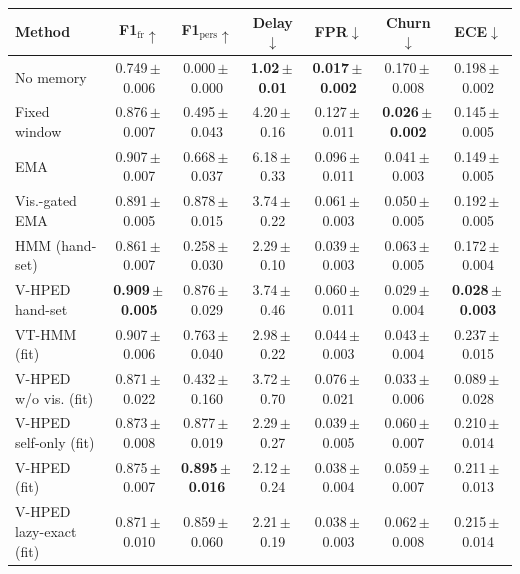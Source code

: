 \begin{tabular}{@{}lcccccc@{}}
\toprule
Method & F1$_{\mathrm{fr}}\uparrow$ & F1$_{\mathrm{pers}}\uparrow$ & Delay$\downarrow$ & FPR$\downarrow$ & Churn$\downarrow$ & ECE$\downarrow$ \\
\midrule
No memory & 0.749\,$\pm$\,0.006 & 0.000\,$\pm$\,0.000 & \textbf{1.02\,$\pm$\,0.01} & \textbf{0.017\,$\pm$\,0.002} & 0.170\,$\pm$\,0.008 & 0.198\,$\pm$\,0.002 \\
Fixed window & 0.876\,$\pm$\,0.007 & 0.495\,$\pm$\,0.043 & 4.20\,$\pm$\,0.16 & 0.127\,$\pm$\,0.011 & \textbf{0.026\,$\pm$\,0.002} & 0.145\,$\pm$\,0.005 \\
EMA & 0.907\,$\pm$\,0.007 & 0.668\,$\pm$\,0.037 & 6.18\,$\pm$\,0.33 & 0.096\,$\pm$\,0.011 & 0.041\,$\pm$\,0.003 & 0.149\,$\pm$\,0.005 \\
Vis.-gated EMA & 0.891\,$\pm$\,0.005 & 0.878\,$\pm$\,0.015 & 3.74\,$\pm$\,0.22 & 0.061\,$\pm$\,0.003 & 0.050\,$\pm$\,0.005 & 0.192\,$\pm$\,0.005 \\
HMM (hand-set) & 0.861\,$\pm$\,0.007 & 0.258\,$\pm$\,0.030 & 2.29\,$\pm$\,0.10 & 0.039\,$\pm$\,0.003 & 0.063\,$\pm$\,0.005 & 0.172\,$\pm$\,0.004 \\
V-HPED hand-set & \textbf{0.909\,$\pm$\,0.005} & 0.876\,$\pm$\,0.029 & 3.74\,$\pm$\,0.46 & 0.060\,$\pm$\,0.011 & 0.029\,$\pm$\,0.004 & \textbf{0.028\,$\pm$\,0.003} \\
VT-HMM (fit) & 0.907\,$\pm$\,0.006 & 0.763\,$\pm$\,0.040 & 2.98\,$\pm$\,0.22 & 0.044\,$\pm$\,0.003 & 0.043\,$\pm$\,0.004 & 0.237\,$\pm$\,0.015 \\
V-HPED w/o vis. (fit) & 0.871\,$\pm$\,0.022 & 0.432\,$\pm$\,0.160 & 3.72\,$\pm$\,0.70 & 0.076\,$\pm$\,0.021 & 0.033\,$\pm$\,0.006 & 0.089\,$\pm$\,0.028 \\
V-HPED self-only (fit) & 0.873\,$\pm$\,0.008 & 0.877\,$\pm$\,0.019 & 2.29\,$\pm$\,0.27 & 0.039\,$\pm$\,0.005 & 0.060\,$\pm$\,0.007 & 0.210\,$\pm$\,0.014 \\
V-HPED (fit) & 0.875\,$\pm$\,0.007 & \textbf{0.895\,$\pm$\,0.016} & 2.12\,$\pm$\,0.24 & 0.038\,$\pm$\,0.004 & 0.059\,$\pm$\,0.007 & 0.211\,$\pm$\,0.013 \\
V-HPED lazy-exact (fit) & 0.871\,$\pm$\,0.010 & 0.859\,$\pm$\,0.060 & 2.21\,$\pm$\,0.19 & 0.038\,$\pm$\,0.003 & 0.062\,$\pm$\,0.008 & 0.215\,$\pm$\,0.014 \\
\bottomrule
\end{tabular}

